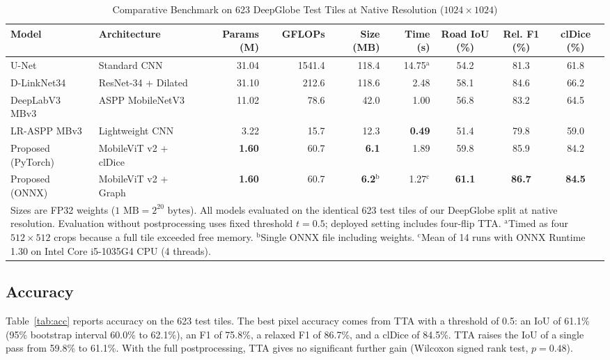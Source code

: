 \documentclass{ieeeaccess}
\begin{document}
\begin{table}[t]
\caption{Comparative Benchmark on 623 DeepGlobe Test Tiles at Native Resolution ($1024 \times 1024$)}
\label{tab:cost}
\centering
\setlength{\tabcolsep}{4pt}
\tablebodyfont
\begin{tabular}{|l|l|r|r|r|r|c|c|c|}
\hline
Model & Architecture & Params (M) & GFLOPs & Size (MB) & Time (s) & Road IoU (\%) & Rel. F1 (\%) & clDice (\%) \\
\hline
U-Net~\cite{ronneberger2015unet} & Standard CNN & 31.04 & 1541.4 & 118.4 & 14.75$^{\mathrm{a}}$ & 54.2 & 81.3 & 61.8 \\
D-LinkNet34~\cite{zhou2018dlinknet} & ResNet-34 + Dilated & 31.10 & 212.6 & 118.6 & 2.48 & 58.1 & 84.6 & 66.2 \\
DeepLabV3 MBv3~\cite{chen2017deeplab} & ASPP MobileNetV3 & 11.02 & 78.6 & 42.0 & 1.00 & 56.8 & 83.2 & 64.5 \\
LR-ASPP MBv3~\cite{howard2019mobilenetv3} & Lightweight CNN & 3.22 & 15.7 & 12.3 & \textbf{0.49} & 51.4 & 79.8 & 59.0 \\
Proposed (PyTorch) & MobileViT v2 + clDice & \textbf{1.60} & 60.7 & \textbf{6.1} & 1.89 & 59.8 & 85.9 & 84.2 \\
Proposed (ONNX) & MobileViT v2 + Graph & \textbf{1.60} & 60.7 & \textbf{6.2}$^{\mathrm{b}}$ & 1.27$^{\mathrm{c}}$ & \textbf{61.1} & \textbf{86.7} & \textbf{84.5} \\
\hline
\multicolumn{9}{p{480pt}}{Sizes are FP32 weights ($1\text{~MB} = 2^{20}\text{ bytes}$). All models evaluated on the identical 623 test tiles of our DeepGlobe split at native resolution. Evaluation without postprocessing uses fixed threshold $t = 0.5$; deployed setting includes four-flip TTA. $^{\mathrm{a}}$Timed as four $512 \times 512$ crops because a full tile exceeded free memory. $^{\mathrm{b}}$Single ONNX file including weights. $^{\mathrm{c}}$Mean of 14 runs with ONNX Runtime 1.30 on Intel Core i5-1035G4 CPU (4 threads).}
\end{tabular}
\end{table}

\subsection{Accuracy}

Table~\ref{tab:acc} reports accuracy on the 623 test tiles. The best pixel accuracy comes from TTA with a threshold of 0.5: an IoU of 61.1\% (95\% bootstrap interval 60.0\% to 62.1\%), an F1 of 75.8\%, a relaxed F1 of 86.7\%, and a clDice of 84.5\%. TTA raises the IoU of a single pass from 59.8\% to 61.1\%. With the full postprocessing, TTA gives no significant further gain (Wilcoxon signed rank test, $p = 0.48$).
\end{document}

